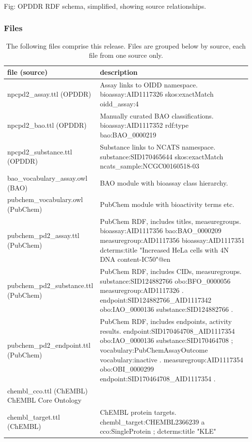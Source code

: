 Fig: OPDDR RDF schema, simplified, showing source relationships.

\subsubsection{Files}

\begin{table}[]
\caption{The following files comprise this release.  Files are grouped below by source, each file from one source only.}
\label{tab:opddr_05}
\centering
\begin{tabular}{p{0.3\linewidth}p{0.7\linewidth}}
\hline
\textbf{file (source)} & \textbf{description} \\
\hline
npcpd2\_assay.ttl (OPDDR) & Assay links to OIDD namespace. 
bioassay:AID1117326 skos:exactMatch oidd\_assay:4 \\
npcpd2\_bao.ttl (OPDDR) & Manually curated BAO classifications. 
bioassay:AID1117352 rdf:type bao:BAO\_0000219 \\
npcpd2\_substance.ttl (OPDDR) & Substance links to NCATS namespace. 
substance:SID170465644 skos:exactMatch ncats\_sample:NCGC00160518-03 \\
bao\_vocabulary\_assay.owl (BAO) & BAO module with bioassay class hierarchy.  \\
pubchem\_vocabulary.owl (PubChem) & PubChem module with bioactivity terms etc. \\
pubchem\_pd2\_assay.ttl (PubChem) & PubChem RDF, includes titles, measuregroups. 
bioassay:AID1117356 bao:BAO\_0000209 measuregroup:AID1117356 
bioassay:AID1117351 dcterms:title "Increased HeLa cells with 4N DNA content-IC50"@en  \\
pubchem\_pd2\_substance.ttl (PubChem) & PubChem RDF, includes CIDs, measuregroups. 
substance:SID124882766 obo:BFO\_0000056 measuregroup:AID1117326 . 
endpoint:SID124882766\_AID1117342 obo:IAO\_0000136 substance:SID124882766 . \\
pubchem\_pd2\_endpoint.ttl (PubChem) & PubChem RDF, includes endpoints, activity results.
endpoint:SID170464708\_AID1117354 
    obo:IAO\_0000136 substance:SID170464708 ; 
    vocabulary:PubChemAssayOutcome vocabulary:inactive . 
measuregroup:AID1117354 obo:OBI\_0000299 endpoint:SID170464708\_AID1117354 . \\
chembl\_cco.ttl (ChEMBL) ChEMBL Core Ontology \\
chembl\_target.ttl (ChEMBL) & ChEMBL protein targets. 
chembl\_target:CHEMBL2366239 a cco:SingleProtein ; dcterms:title "KLE" \\

\end{tabular}
\end{table}
